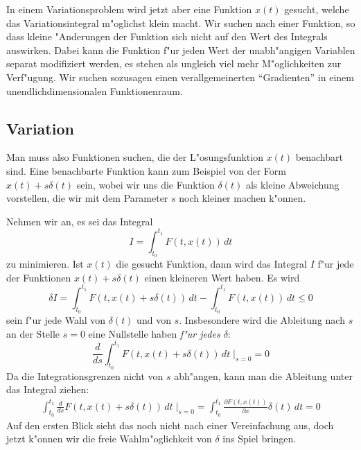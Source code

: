 In einem Variationsproblem wird jetzt aber eine Funktion $x(t)$ gesucht,
welche das Variationsintegral m"oglichst klein macht. Wir suchen
nach einer Funktion, so dass kleine "Anderungen der Funktion sich
nicht auf den Wert des Integrals auswirken. Dabei kann die
Funktion f"ur jeden Wert der unabh"angigen Variablen separat
modifiziert werden, es stehen als ungleich viel mehr 
M"oglichkeiten zur Verf"ugung. Wir suchen sozusagen einen 
verallgemeinerten ``Gradienten'' in einem unendlichdimensionalen
Funktionenraum.


\subsection{Variation}
Man muss also Funktionen 
suchen, die der L"osungsfunktion $x(t)$ benachbart sind.
Eine benachbarte Funktion kann zum Beispiel von der Form
$x(t)+s\delta(t)$ sein, wobei wir uns die Funktion $\delta(t)$
als kleine Abweichung vorstellen, die wir mit dem Parameter
$s$ noch kleiner machen k"onnen. 

Nehmen wir an, es sei das Integral
\begin{equation}
I=\int_{t_0}^{t_1} F(t, x(t)) \,dt
\end{equation}
zu minimieren. Ist $x(t)$ die gesucht Funktion, dann
wird das Integral $I$ f"ur jede der Funktionen $x(t)+s\delta(t)$
einen kleineren Wert haben. Es wird
\begin{equation}
\delta I =
\int_{t_0}^{t_1}F(t, x(t) + s\delta(t))\,dt
-
\int_{t_0}^{t_1}F(t, x(t))\,dt\le 0
\end{equation}
sein f"ur jede Wahl von $\delta(t)$ und von $s$. Insbesondere wird die
Ableitung nach $s$ an der Stelle $s=0$ eine Nullstelle haben
{\it f"ur jedes $\delta$}:
\begin{equation}
\frac{d}{ds}\int_{t_0}^{t_1}F(t,x(t)+s\delta(t))\,dt\;\bigg|_{s=0}=0
\end{equation}
Da die Integrationsgrenzen nicht von $s$ abh"angen, kann man die
Ableitung unter das Integral ziehen:
\begin{align*}
\int_{t_0}^{t_1}\frac{d}{ds}F(t, x(t)+s\delta(t))\,dt\;\bigg|_{s=0}
=
\int_{t_0}^{t_1}\frac{\partial F(t, x(t))}{\partial x}\delta(t)\,dt=0
\end{align*}
Auf den ersten Blick sieht das noch nicht nach einer Vereinfachung aus,
doch jetzt k"onnen wir die freie Wahlm"oglichkeit von $\delta$ ins
Spiel bringen.

